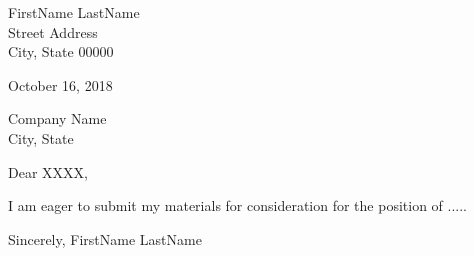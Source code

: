 \documentclass[11pt,a4paper,sans]{letter} %
\begin{document}
FirstName LastName \\
Street Address \\
City, State 00000

October 16, 2018

Company Name\\
City, State

Dear XXXX, %

\bigbreak %

I am eager to submit my materials for consideration for the position of .....
\blindtext %


\bigbreak

\blindtext %

\bigbreak

\blindtext %

\bigbreak %
Sincerely,
\bigbreak %
FirstName LastName %
\end{document}
